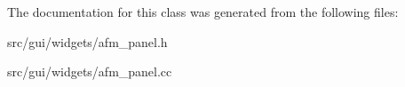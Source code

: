 The documentation for this class was generated from the following files\+:\begin{DoxyCompactItemize}
\item 
src/gui/widgets/afm\+\_\+panel.\+h\item 
src/gui/widgets/afm\+\_\+panel.\+cc\end{DoxyCompactItemize}
